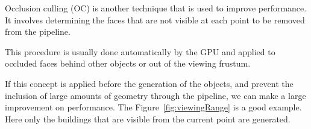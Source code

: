 Occlusion culling (OC) is another technique that is used to improve performance. It involves determining the faces that are not visible at each point to be removed from the pipeline.

This procedure is usually done automatically by the GPU and applied to occluded faces behind other objects or out of the viewing frustum.

If this concept is applied before the generation of the objects, and prevent the inclusion of large amounts of geometry through the pipeline, we can make a large improvement on performance. The Figure~\ref{fig:viewingRange} is a good example. Here only the buildings that are visible from the current point are generated.



